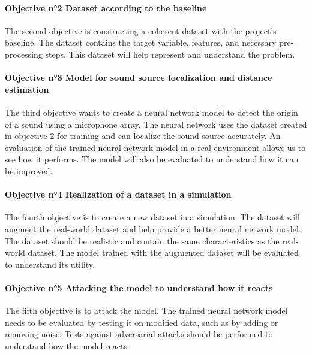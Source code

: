 \paragraph{Objective n°2 Dataset according to the baseline}
\label{intro:objective2}

The second objective is constructing a coherent dataset with the project's baseline. The dataset contains the target variable, features, and necessary pre-processing steps. This dataset will help represent and understand the problem.

\paragraph{Objective n°3 Model for sound source localization and distance estimation}
\label{intro:objective3}

The third objective wants to create a neural network model to detect the origin of a sound using a microphone array. The neural network uses the dataset created in objective 2 for training and can localize the sound source accurately. An evaluation of the trained neural network model in a real environment allows us to see how it performs. The model will also be evaluated to understand how it can be improved.

\paragraph{Objective n°4 Realization of a dataset in a simulation}
\label{intro:objective4}

The fourth objective is to create a new dataset in a simulation. The dataset will augment the real-world dataset and help provide a better neural network model. The dataset should be realistic and contain the same characteristics as the real-world dataset. The model trained with the augmented dataset will be evaluated to understand its utility.

\paragraph{Objective n°5 Attacking the model to understand how it reacts}
\label{intro:objective5}

The fifth objective is to attack the model. The trained neural network model needs to be evaluated by testing it on modified data, such as by adding or removing noise. Tests against adversarial attacks should be performed to understand how the model reacts.

